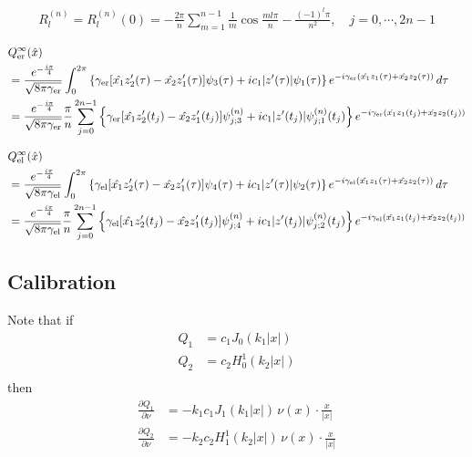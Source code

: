 \begin{align}
  R^{(n)}_l = R^{(n)}_l(0) = -\frac{2\pi}{n}\sum_{m=1}^{n-1}\frac{1}{m}\cos\frac{ml\pi}{n}-\frac{(-1)^l\pi}{n^2},\quad j=0,\cdots,2n-1
\end{align}

\begin{align}
  &Q_\text{er}^\infty(\hat x)\notag \\
  &= \frac{e^{-\frac{i\pi}{4}}}{\sqrt{8\pi\gamma_\text{er}}}\int_0^{2\pi}\left\{\gamma_\text{er}[\hat{x_1}z'_2(\tau)-\hat{x_2}z'_1(\tau)]\psi_3(\tau)+ic_1|z'(\tau)|\psi_1(\tau)\right\}e^{-i\gamma_\text{er}(\hat{x_1}z_1(\tau)+\hat{x_2}z_2(\tau))}\,d\tau\notag \\
  &= \frac{e^{-\frac{i\pi}{4}}}{\sqrt{8\pi\gamma_\text{er}}}\frac{\pi}{n}\sum_{j=0}^{2n-1}\left\{\gamma_\text{er}[\hat{x_1}z'_2(t_j)-\hat{x_2}z'_1(t_j)]\psi^{(n)}_{j;3}+ic_1|z'(t_j)|\psi^{(n)}_{j;1}(t_j)\right\}e^{-i\gamma_\text{er}(\hat{x_1}z_1(t_j)+\hat{x_2}z_2(t_j))}
\end{align}

\begin{align}
  &Q_\text{el}^\infty(\hat x)\notag \\
  &= \frac{e^{-\frac{i\pi}{4}}}{\sqrt{8\pi\gamma_\text{el}}}\int_0^{2\pi}\left\{\gamma_\text{el}[\hat{x_1}z'_2(\tau)-\hat{x_2}z'_1(\tau)]\psi_4(\tau)+ic_1|z'(\tau)|\psi_2(\tau)\right\}e^{-i\gamma_\text{el}(\hat{x_1}z_1(\tau)+\hat{x_2}z_2(\tau))}\,d\tau\notag \\
  &= \frac{e^{-\frac{i\pi}{4}}}{\sqrt{8\pi\gamma_\text{el}}}\frac{\pi}{n}\sum_{j=0}^{2n-1}\left\{\gamma_\text{el}[\hat{x_1}z'_2(t_j)-\hat{x_2}z'_1(t_j)]\psi^{(n)}_{j;4}+ic_1|z'(t_j)|\psi^{(n)}_{j;2}(t_j)\right\}e^{-i\gamma_\text{el}(\hat{x_1}z_1(t_j)+\hat{x_2}z_2(t_j))}
\end{align}

\subsection{Calibration}

Note that if
\begin{align*}
  Q_1 &= c_1 J_0(k_1 |x|) \\
  Q_2 &= c_2 H_0^1(k_2 |x|) \\
\end{align*}
then
\begin{align*}
  \frac{\partial Q_1}{\partial\nu} &= -k_1 c_1 J_1(k_1|x|)\,\nu(x)\cdot\frac{x}{|x|}\\
  \frac{\partial Q_2}{\partial\nu} &= -k_2 c_2 H_1^1(k_2|x|)\,\nu(x)\cdot\frac{x}{|x|}\\
\end{align*}

